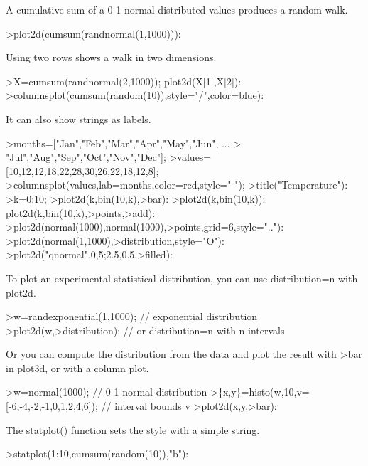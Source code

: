 \documentclass[a4paper,10pt]{article}
\begin{document}
\begin{eulernotebook}
\begin{eulercomment}
\begin{eulercomment}
\begin{eulercomment}
\begin{eulercomment}
\begin{eulercomment}
A cumulative sum of a 0-1-normal distributed values produces a random walk.
\end{eulercomment}
\begin{eulerprompt}
>plot2d(cumsum(randnormal(1,1000))):
\end{eulerprompt}
\begin{eulercomment}
Using two rows shows a walk in two dimensions.
\end{eulercomment}
\begin{eulerprompt}
>X=cumsum(randnormal(2,1000)); plot2d(X[1],X[2]):
>columnsplot(cumsum(random(10)),style="/",color=blue):
\end{eulerprompt}
\begin{eulercomment}
It can also show strings as labels.
\end{eulercomment}
\begin{eulerprompt}
>months=["Jan","Feb","Mar","Apr","May","Jun", ...
>  "Jul","Aug","Sep","Oct","Nov","Dec"];
>values=[10,12,12,18,22,28,30,26,22,18,12,8];
>columnsplot(values,lab=months,color=red,style="-");
>title("Temperature"):
>k=0:10;
>plot2d(k,bin(10,k),>bar):
>plot2d(k,bin(10,k)); plot2d(k,bin(10,k),>points,>add):
>plot2d(normal(1000),normal(1000),>points,grid=6,style=".."):
>plot2d(normal(1,1000),>distribution,style="O"):
>plot2d("qnormal",0,5;2.5,0.5,>filled):
\end{eulerprompt}
\begin{eulercomment}
To plot an experimental statistical distribution, you can use distribution=n with
plot2d.
\end{eulercomment}
\begin{eulerprompt}
>w=randexponential(1,1000); // exponential distribution
>plot2d(w,>distribution): // or distribution=n with n intervals
\end{eulerprompt}
\begin{eulercomment}
Or you can compute the distribution from the data and plot the result with \textgreater{}bar in
plot3d, or with a column plot.
\end{eulercomment}
\begin{eulerprompt}
>w=normal(1000); // 0-1-normal distribution
>\{x,y\}=histo(w,10,v=[-6,-4,-2,-1,0,1,2,4,6]); // interval bounds v
>plot2d(x,y,>bar):
\end{eulerprompt}
\begin{eulercomment}
The statplot() function sets the style with a simple string.
\end{eulercomment}
\begin{eulerprompt}
>statplot(1:10,cumsum(random(10)),"b"):

\end{eulerprompt}
\end{eulercomment}
\end{eulercomment}
\end{eulercomment}
\end{eulercomment}
\end{eulernotebook}
\end{document}
